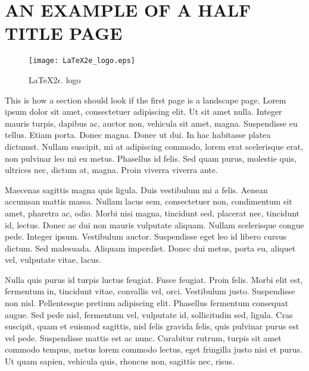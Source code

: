 \chapter{AN EXAMPLE OF A HALF TITLE PAGE}%
\label{appendixB}

\clearpage %
\thispagestyle{plain}
\begin{landscape}
\begin{figure}

  \begin{center}
    \texttt{[image: LaTeX2e\_logo.eps]}
    \caption{\LaTeX 2\ensuremath{\epsilon.} logo}\label{biglogo}
  \end{center}
\end{figure}
\end{landscape}


This is how a section should look if the first page is a landscape page.
Lorem ipsum dolor sit amet, consectetuer adipiscing elit. Ut sit
amet nulla. Integer mauris turpis, dapibus ac, auctor non, vehicula
sit amet, magna. Suspendisse eu tellus. Etiam porta. Donec magna.
Donec ut dui. In hac habitasse platea dictumst. Nullam suscipit, mi
at adipiscing commodo, lorem erat scelerisque erat, non pulvinar leo
mi eu metus. Phasellus id felis. Sed quam purus, molestie quis,
ultrices nec, dictum at, magna. Proin viverra viverra ante.

Maecenas sagittis magna quis ligula. Duis vestibulum mi a felis.
Aenean accumsan mattis massa. Nullam lacus sem, consectetuer non,
condimentum sit amet, pharetra ac, odio. Morbi nisi magna, tincidunt
sed, placerat nec, tincidunt id, lectus. Donec ac dui non mauris
vulputate aliquam. Nullam scelerisque congue pede. Integer ipsum.
Vestibulum auctor. Suspendisse eget leo id libero cursus dictum. Sed
malesuada. Aliquam imperdiet. Donec dui metus, porta eu, aliquet
vel, vulputate vitae, lacus.

Nulla quis purus id turpis luctus feugiat. Fusce feugiat. Proin
felis. Morbi elit est, fermentum in, tincidunt vitae, convallis vel,
orci. Vestibulum justo. Suspendisse non nisl. Pellentesque pretium
adipiscing elit. Phasellus fermentum consequat augue. Sed pede nisl,
fermentum vel, vulputate id, sollicitudin sed, ligula. Cras
suscipit, quam et euismod sagittis, nisl felis gravida felis, quis
pulvinar purus est vel pede. Suspendisse mattis est ac nunc.
Curabitur rutrum, turpis sit amet commodo tempus, metus lorem
commodo lectus, eget fringilla justo nisi et purus. Ut quam sapien,
vehicula quis, rhoncus non, sagittis nec, risus.

